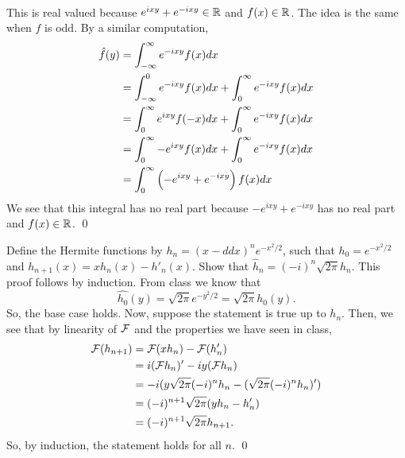 \documentclass{article}
\begin{document}
\begin{enumerate}[(a)]
\begin{align*}
    \end{align*}
    This is real valued because $ e^{ixy}+ e^{-ixy} \in \RR$ and $f(x) \in \RR$. 
    \hop 
    The idea is the same when $f$ is odd. By a similar computation,
    \begin{align*}
        \hat{f}(y) &= \int_{-\infty}^\infty e^{-ixy}f(x)dx \\
        &= \int_{-\infty}^0 e^{-ixy}f(x)dx + \int_{0}^\infty e^{-ixy}f(x)dx\\
        &= \int_{0}^\infty e^{ixy}f(-x)dx + \int_{0}^\infty e^{-ixy}f(x)dx\\
        &= \int_{0}^\infty -e^{ixy}f(x)dx + \int_{0}^\infty e^{-ixy}f(x)dx\\
        &= \int_{0}^\infty\del{ -e^{ixy}+ e^{-ixy}}f(x)dx\\
    \end{align*}
    We see that this integral has no real part because $-e^{ixy}+ e^{-ixy}$ has no real part and $f(x)\in \RR$. \qed
\end{enumerate}


\newpage
{} Define the Hermite functions by $h_n = (x - d
dx
)^n e^{-x^2/2}$, such that $h_0 = e^{-x^2/2}$ and
$h_{n+1}(x) = xh_n(x) - h'_n(x)$. Show that $\hat{h}_n = (-i)^n\sqrt{2\pi} h_n$. \tri
\hop 
\solution
This proof follows by induction. From class we know that 
\[\hat{h_0}(y)=\sqrt{2\pi}e^{-y^2/2} = \sqrt{2\pi}h_0(y).\] 
So, the base case holds. Now, suppose the statement is true up to $h_n$. Then, we see that by linearity of $\cal{F}$ and the properties we have seen in class,
\begin{align*}
    \cal{F}(h_{n+1}) &= \cal{F}(xh_n)-\cal{F}(h_n')\\
    &= i(\cal{F}h_n)' - iy(\cal{F}h_n) \\
    &= -i(y\sqrt{2\pi}(-i)^n h_n - (\sqrt{2\pi}(-i)^n h_n)') \\
    &= (-i)^{n+1}\sqrt{2\pi}(yh_n - h_n')\\
    &= (-i)^{n+1}\sqrt{2\pi}h_{n+1}.
\end{align*}
So, by induction, the statement holds for all $n$. \qed
\end{document}
